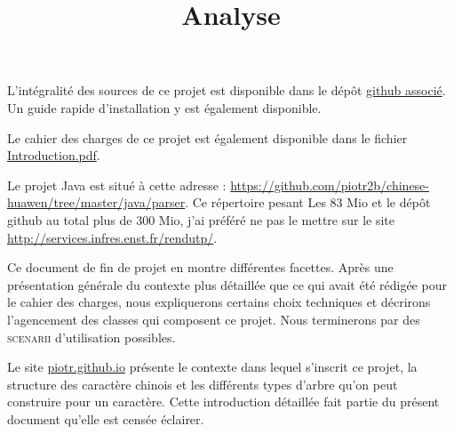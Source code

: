 \documentclass[12pt,onecolumn]{article}
\title{Analyse}
\begin{document}

\maketitle

L'intégralité des sources de ce projet est disponible dans le dépôt \href{https://github.com/piotr2b/chinese-huawen}{github associé}. Un guide rapide d'installation y est également disponible.

Le cahier des charges de ce projet est également disponible dans le fichier \href{https://github.com/piotr2b/chinese-huawen/raw/master/documents/Introduction/Introduction.pdf}{Introduction.pdf}.

Le projet Java est situé à cette adresse : \url{https://github.com/piotr2b/chinese-huawen/tree/master/java/parser}. Ce répertoire pesant Les 83 Mio et le dépôt github au total plus de 300 Mio, j'ai préféré ne pas le mettre sur le site \url{http://services.infres.enst.fr/rendutp/}.

Ce document de fin de projet en montre différentes facettes. Après une présentation générale du contexte plus détaillée que ce qui avait été rédigée pour le cahier des charges, nous expliquerons certains choix techniques et décrirons l'agencement des classes qui composent ce projet. Nous terminerons par des \textsc{scenarii} d'utilisation possibles.

Le site \url{piotr.github.io} présente le contexte dans lequel s'inscrit ce projet, la structure des caractère chinois et les différents types d'arbre qu'on peut construire pour un caractère. Cette introduction détaillée fait partie du présent document qu'elle est censée éclairer.
\end{document}
